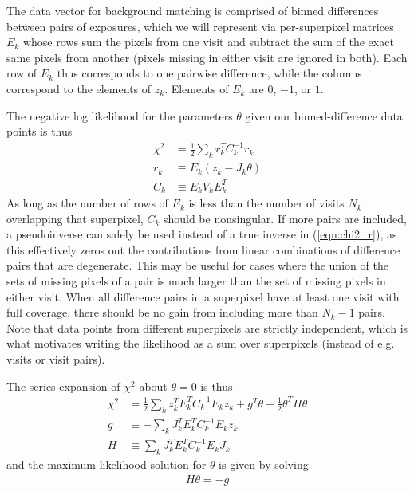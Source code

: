 \documentclass[DM,lsstdraft,authoryear,toc]{lsstdoc}
\begin{document}
The data vector for background matching is comprised of binned differences between pairs of exposures, which we will represent via per-superpixel matrices $E_k$ whose rows sum the pixels from one visit and subtract the sum of the exact same pixels from another (pixels missing in either visit are ignored in both).
Each row of $E_k$ thus corresponds to one pairwise difference, while the columns correspond to the elements of $z_k$.
Elements of $E_k$ are $0$, $-1$, or $1$.

The negative log likelihood for the parameters $\theta$ given our binned-difference data points is thus
\begin{align}
	\chi^2 & = \frac{1}{2} \sum_k r_k^T C_k^{-1} r_k \label{eqn:chi2_r} \\
	r_k    & \equiv E_k \left( z_k - J_k\theta \right)                  \\
	C_k    & \equiv E_k V_k E_k^T
\end{align}
As long as the number of rows of $E_k$ is less than the number of visits $N_k$ overlapping that superpixel, $C_k$ should be nonsingular.
If more pairs are included, a pseudoinverse can safely be used instead of a true inverse in (\ref{eqn:chi2_r}), as this effectively zeros out the contributions from linear combinations of difference pairs that are degenerate.
This may be useful for cases where the union of the sets of missing pixels of a pair is much larger than the set of missing pixels in either visit.
When all difference pairs in a superpixel have at least one visit with full coverage, there should be no gain from including more than $N_k-1$ pairs.
Note that data points from different superpixels are strictly independent, which is what motivates writing the likelihood as a sum over superpixels (instead of e.g. visits or visit pairs).

The series expansion of $\chi^2$ about $\theta=0$ is thus
\begin{align}
	\chi^2 & = \frac{1}{2} \sum_k z_k^T E_k^T C_k^{-1} E_k z_k
	+ g^T \theta + \frac{1}{2}\theta^T H \theta                         \\
	g      & \equiv - \sum_k J_k^T E_k^T C_k^{-1} E_k z_k \label{eqn:g} \\
	H      & \equiv \sum_k J_k^T E_k^T C_k^{-1} E_k J_k \label{eqn:H}
\end{align}
and the maximum-likelihood solution for $\theta$ is given by solving
\begin{align}
	H\theta = -g
\end{align}
\end{document}
